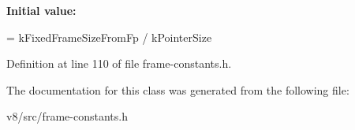 {\bfseries Initial value\+:}
\begin{DoxyCode}
=
      kFixedFrameSizeFromFp / kPointerSize
\end{DoxyCode}


Definition at line 110 of file frame-\/constants.\+h.



The documentation for this class was generated from the following file\+:\begin{DoxyCompactItemize}
\item 
v8/src/frame-\/constants.\+h\end{DoxyCompactItemize}
